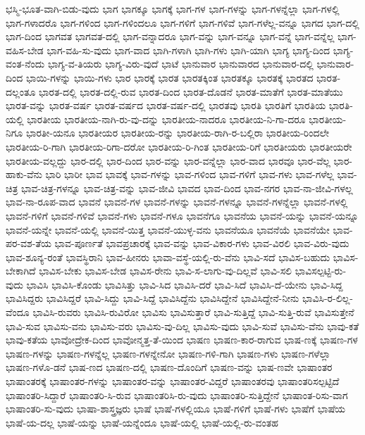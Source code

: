 {ಭಸ್ಮಿ-ಭೂತ-ವಾಗಿ-ಬಿಡು-ವುದು
ಭಾಗ
ಭಾಗಕ್ಕೂ
ಭಾಗಕ್ಕೆ
ಭಾಗ-ಗಳ
ಭಾಗ-ಗಳನ್ನು
ಭಾಗ-ಗಳನ್ನೆಲ್ಲಾ
ಭಾಗ-ಗಳಲ್ಲಿ
ಭಾಗ-ಗಳಾದರೊ
ಭಾಗ-ಗಳಿಂದ
ಭಾಗ-ಗಳಿಂದಲೂ
ಭಾಗ-ಗಳಿಗೆ
ಭಾಗ-ಗಳಿವೆ
ಭಾಗ-ಗಳೆಲ್ಲ-ವನ್ನೂ
ಭಾಗದ
ಭಾಗ-ದಲ್ಲಿ
ಭಾಗ-ದಿಂದ
ಭಾಗವತ
ಭಾಗವತ-ದಲ್ಲಿ
ಭಾಗ-ವನ್ನಾದರೂ
ಭಾಗ-ವನ್ನು
ಭಾಗ-ವನ್ನೂ
ಭಾಗ-ವನ್ನೆ
ಭಾಗ-ವನ್ನೆಲ್ಲ
ಭಾಗ-ವಹಿಸ-ಬೇಡ
ಭಾಗ-ವಹಿ-ಸು-ವುದು
ಭಾಗ-ವಾದ
ಭಾಗಿ-ಗಳಾಗಿ
ಭಾಗಿ-ಗಳು
ಭಾಗಿ-ಯಾಗಿ
ಭಾಗ್ಯ
ಭಾಗ್ಯ-ದಿಂದ
ಭಾಗ್ಯ-ವಂತ-ನೆಂದು
ಭಾಗ್ಯ-ವ-ತಿಯರು
ಭಾಗ್ಯ-ವಿರು-ವುದೆ
ಭಾಟೆ
ಭಾನುವಾರ
ಭಾನುವಾರದ
ಭಾನುವಾರ-ದಲ್ಲಿ
ಭಾನುವಾರ-ದಿಂದ
ಭಾಯಿ-ಗಳನ್ನು
ಭಾಯಿ-ಗಳು
ಭಾರ
ಭಾರಕ್ಕೆ
ಭಾರತ
ಭಾರತಕ್ಕಿಂತ
ಭಾರತಕ್ಕೂ
ಭಾರತಕ್ಕೆ
ಭಾರತದ
ಭಾರತ-ದಲ್ಲಂತೂ
ಭಾರತ-ದಲ್ಲಿ
ಭಾರತ-ದಲ್ಲಿ-ರುವ
ಭಾರತ-ದಿಂದ
ಭಾರತ-ದೊಡನೆ
ಭಾರತ-ಮಾತೆಗೆ
ಭಾರತ-ಮಾತೆಯು
ಭಾರತ-ವನ್ನು
ಭಾರತ-ವರ್ಷ
ಭಾರತ-ವರ್ಷದ
ಭಾರತ-ವರ್ಷ-ದಲ್ಲಿ
ಭಾರತವು
ಭಾರತಿ
ಭಾರತಿಗೆ
ಭಾರತಿಯ
ಭಾರತಿ-ಯಲ್ಲಿ
ಭಾರತೀಯ
ಭಾರತೀಯ-ನಾಗಿ-ರು-ವು-ದನ್ನು
ಭಾರತೀಯ-ನಾದರೂ
ಭಾರತೀಯ-ನಿ-ಗಾ-ದರೂ
ಭಾರತೀಯ-ನಿಗೂ
ಭಾರತೀ-ಯನೂ
ಭಾರತೀಯರ
ಭಾರತೀಯ-ರನ್ನು
ಭಾರತೀಯ-ರಾಗಿ-ರ-ಬಲ್ಲಿರಾ
ಭಾರತೀಯ-ರಿಂದಲೇ
ಭಾರತೀಯ-ರಿ-ಗಾಗಿ
ಭಾರತೀಯ-ರಿಗಾ-ದರೋ
ಭಾರತೀಯ-ರಿ-ಗಿಂತ
ಭಾರತೀಯ-ರಿಗೆ
ಭಾರತೀಯರು
ಭಾರತೀಯರೇ
ಭಾರತೀಯ-ವಲ್ಲದ್ದು
ಭಾರ-ದಲ್ಲಿ
ಭಾರ-ದಿಂದ
ಭಾರ-ವನ್ನು
ಭಾರ-ವನ್ನೆಲ್ಲಾ
ಭಾರ-ವಾದ
ಭಾರವೂ
ಭಾರ-ವೆಲ್ಲ
ಭಾರ-ಹಾಕು-ವೆನು
ಭಾರಿ
ಭಾರೀ
ಭಾವ
ಭಾವಕ್ಕೆ
ಭಾವ-ಗಳನ್ನು
ಭಾವ-ಗಳಿಂದ
ಭಾವ-ಗಳಿಗೆ
ಭಾವ-ಗಳು
ಭಾವ-ಗಳೆಲ್ಲ
ಭಾವ-ಚಿತ್ರ
ಭಾವ-ಚಿತ್ರ-ಗಳನ್ನೂ
ಭಾವ-ಚಿತ್ರ-ವನ್ನು
ಭಾವ-ಜೀವಿ
ಭಾವದ
ಭಾವ-ದಿಂದ
ಭಾವ-ನಗರ
ಭಾವ-ನಾ-ಜೀವಿ-ಗಳಲ್ಲ
ಭಾವ-ನಾ-ರೂಪ-ವಾದ
ಭಾವನೆ
ಭಾವನೆ-ಗಳ
ಭಾವನೆ-ಗಳನ್ನು
ಭಾವನೆ-ಗಳನ್ನೂ
ಭಾವನೆ-ಗಳನ್ನೆಲ್ಲಾ
ಭಾವನೆ-ಗಳಲ್ಲಿ
ಭಾವನೆ-ಗಳಿಗೆ
ಭಾವನೆ-ಗಳಿವೆ
ಭಾವನೆ-ಗಳು
ಭಾವನೆ-ಗಳೂ
ಭಾವನೆಗೂ
ಭಾವನೆಯ
ಭಾವನೆ-ಯನ್ನು
ಭಾವನೆ-ಯನ್ನೂ
ಭಾವನೆ-ಯನ್ನೇ
ಭಾವನೆ-ಯಲ್ಲಿ
ಭಾವನೆ-ಯಿತ್ತ
ಭಾವನೆ-ಯುಳ್ಳ-ವನು
ಭಾವನೆಯೂ
ಭಾವನೆಯೆ
ಭಾವನೆಯೇ
ಭಾವ-ಪರ-ವಶ-ತೆಯ
ಭಾವ-ಪೂರ್ಣತೆ
ಭಾವಪ್ರಚಾರಕ್ಕೆ
ಭಾವ-ವನ್ನು
ಭಾವ-ವಿಕಾರ-ಗಳು
ಭಾವ-ವಿರಲಿ
ಭಾವ-ವಿರು-ವುದು
ಭಾವ-ಶೂನ್ಯ-ರಂತೆ
ಭಾವಸ್ಥಿರಾನಿ
ಭಾವ-ಹೀನರು
ಭಾವಾ-ವಸ್ಥೆ-ಯಲ್ಲಿ-ರು-ವೆನು
ಭಾವಿ-ಸದೆ
ಭಾವಿಸ-ಬಹುದು
ಭಾವಿಸ-ಬೇಕಾಗಿದೆ
ಭಾವಿಸ-ಬೇಕು
ಭಾವಿಸ-ಬೇಡ
ಭಾವಿಸ-ರೇನು
ಭಾವಿ-ಸ-ಲಾಗು-ವು-ದಿಲ್ಲವೆ
ಭಾವಿ-ಸಲಿ
ಭಾವಿಸಲ್ಪಟ್ಟಿ-ರು-ವುದು
ಭಾವಿಸಿ
ಭಾವಿಸಿ-ಕೊಂಡು
ಭಾವಿಸಿತ್ತು
ಭಾವಿ-ಸಿದ
ಭಾವಿಸಿ-ದರೆ
ಭಾವಿ-ಸಿದೆ
ಭಾವಿಸಿ-ದೆ-ಯೇನು
ಭಾವಿ-ಸಿದ್ದ
ಭಾವಿಸಿದ್ದರು
ಭಾವಿಸಿದ್ದರೆ
ಭಾವಿ-ಸಿದ್ದು
ಭಾವಿ-ಸಿದ್ದೆ
ಭಾವಿಸಿದ್ದೆನು
ಭಾವಿಸಿದ್ದೇನೆ
ಭಾವಿಸಿದ್ದೇನೆ-ನೀನು
ಭಾವಿಸಿ-ರ-ಲಿಲ್ಲ-ವೆಂದೂ
ಭಾವಿಸಿ-ರುವರು
ಭಾವಿಸಿ-ರುವಿರೋ
ಭಾವಿಸು
ಭಾವಿಸುತ್ತಾರೆ
ಭಾವಿ-ಸುತ್ತಿದ್ದೆ
ಭಾವಿ-ಸುತ್ತಿ-ರುವೆ
ಭಾವಿಸುತ್ತೇನೆ
ಭಾವಿ-ಸುವ
ಭಾವಿಸು-ವನು
ಭಾವಿಸು-ವರು
ಭಾವಿಸು-ವು-ದಿಲ್ಲ
ಭಾವಿಸು-ವುದು
ಭಾವಿ-ಸುವೆ
ಭಾವಿಸು-ವೆನು
ಭಾವು-ಕತೆ
ಭಾವು-ಕತೆಯ
ಭಾವೋದ್ರೇಕ-ದಿಂದ
ಭಾವೋನ್ಮತ್ತ-ತೆ-ಯಿಂದ
ಭಾಷಣ
ಭಾಷಣ-ಕಾರ-ರಾಗುವ
ಭಾಷ-ಣಕ್ಕೆ
ಭಾಷಣ-ಗಳ
ಭಾಷಣ-ಗಳನ್ನು
ಭಾಷಣ-ಗಳನ್ನೆಲ್ಲ
ಭಾಷಣ-ಗಳನ್ನೇನೋ
ಭಾಷಣ-ಗಳಿ-ಗಾಗಿ
ಭಾಷಣ-ಗಳು
ಭಾಷಣ-ಗಳೆಲ್ಲಾ
ಭಾಷಣ-ಗಳೊ-ಡನೆ
ಭಾಷ-ಣದ
ಭಾಷಣ-ದಲ್ಲಿ
ಭಾಷಣ-ದೊಂದಿಗೆ
ಭಾಷಣ-ವನ್ನು
ಭಾಷ-ಣವೇ
ಭಾಷಾಂತರ
ಭಾಷಾಂತರಕ್ಕೆ
ಭಾಷಾಂತರ-ಗಳನ್ನು
ಭಾಷಾಂತರ-ವನ್ನು
ಭಾಷಾಂತರ-ವಿದ್ದರೆ
ಭಾಷಾಂತರವು
ಭಾಷಾಂತರಿಸಲ್ಪಟ್ಟಿದೆ
ಭಾಷಾಂತರಿ-ಸಿದ್ದಾರೆ
ಭಾಷಾಂತರಿ-ಸಿ-ರುವ
ಭಾಷಾಂತರಿಸಿ-ರು-ವುದು
ಭಾಷಾಂತರಿ-ಸುತ್ತಿದ್ದೇನೆ
ಭಾಷಾಂತ-ರಿಸು-ವಾಗ
ಭಾಷಾಂತರಿ-ಸು-ವುದು
ಭಾಷಾ-ಶಾಸ್ತ್ರಜ್ಞರು
ಭಾಷೆ
ಭಾಷೆ-ಗಳಲ್ಲಿಯೂ
ಭಾಷೆ-ಗಳಿಗೆ
ಭಾಷೆ-ಗಳು
ಭಾಷೆಗೆ
ಭಾಷೆಯ
ಭಾಷೆ-ಯ-ದಲ್ಲ
ಭಾಷೆ-ಯನ್ನು
ಭಾಷೆ-ಯನ್ನೆಂದೂ
ಭಾಷೆ-ಯಲ್ಲಿ
ಭಾಷೆ-ಯಲ್ಲಿ-ರು-ವಂತಹ
}

